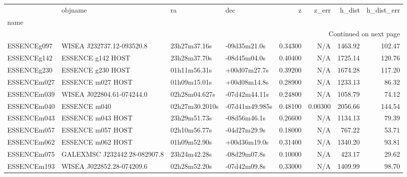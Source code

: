 \begin{longtable}{llllrrrr}
\label{tab:Ned}\\
\toprule
{} &                         objname &              ra &             dec &        z &    z_err &   h_dist &  h_dist_err \\
name             &                                 &                 &                 &          &          &          &             \\
\midrule
\endhead
\midrule
\multicolumn{8}{r}{{Continued on next page}} \\
\midrule
\endfoot

\bottomrule
\endlastfoot
ESSENCEg097      &       WISEA J232737.12-093520.8 &    23h27m37.16s &    -09d35m21.0s &  0.34300 &      N/A &  1463.92 &      102.47 \\
ESSENCEg142      &               ESSENCE g142 HOST &    23h28m37.70s &    -08d45m04.0s &  0.40400 &      N/A &  1725.14 &      120.76 \\
ESSENCEg230      &               ESSENCE g230 HOST &    01h11m56.31s &    +00d07m27.7s &  0.39200 &      N/A &  1674.28 &      117.20 \\
ESSENCEm027      &               ESSENCE m027 HOST &    01h09m15.01s &    +00d08m14.8s &  0.28900 &      N/A &  1233.13 &       86.32 \\
ESSENCEm039      &       WISEA J022804.61-074244.0 &   02h28m04.627s &   -07d42m44.11s &  0.24800 &      N/A &  1058.79 &       74.12 \\
ESSENCEm040      &                    ESSENCE m040 &  02h27m30.2010s &  -07d41m49.985s &  0.48100 &  0.00300 &  2056.66 &      144.54 \\
ESSENCEm043      &               ESSENCE m043 HOST &    23h29m51.73s &    -08d56m46.1s &  0.26600 &      N/A &  1134.13 &       79.39 \\
ESSENCEm057      &               ESSENCE m057 HOST &    02h10m56.77s &    -04d27m29.9s &  0.18000 &      N/A &   767.22 &       53.71 \\
ESSENCEm062      &               ESSENCE m062 HOST &    01h09m52.90s &    +00d36m19.0s &  0.31400 &      N/A &  1340.20 &       93.81 \\
ESSENCEm075      &  GALEXMSC J232442.28-082907.8   &    23h24m42.28s &    -08d29m07.8s &  0.10000 &      N/A &   423.17 &       29.62 \\
ESSENCEm193      &       WISEA J022852.28-074209.6 &    02h28m52.20s &    -07d42m09.8s &  0.33000 &      N/A &  1409.99 &       98.70 \\

\end{longtable}
